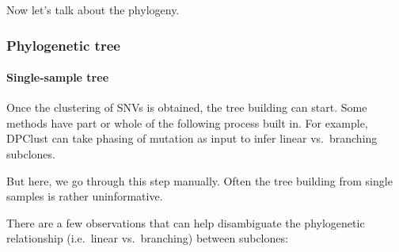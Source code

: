 \documentclass[]{article}
\let\oldparagraph\paragraph
\renewcommand{\paragraph}[1]{\oldparagraph{#1}\mbox{}}
\begin{document}
Now let's talk about the phylogeny.

\newpage

\hypertarget{phylogenetic-tree}{%
\subsubsection{Phylogenetic tree}\label{phylogenetic-tree}}

\hypertarget{single-sample-tree}{%
\paragraph{Single-sample tree}\label{single-sample-tree}}

Once the clustering of SNVs is obtained, the tree building can start.
Some methods have part or whole of the following process built in. For
example, DPClust can take phasing of mutation as input to infer linear
vs.~branching subclones.

But here, we go through this step manually. Often the tree building from
single samples is rather uninformative.

There are a few observations that can help disambiguate the phylogenetic
relationship (i.e.~linear vs.~branching) between subclones:
\end{document}
